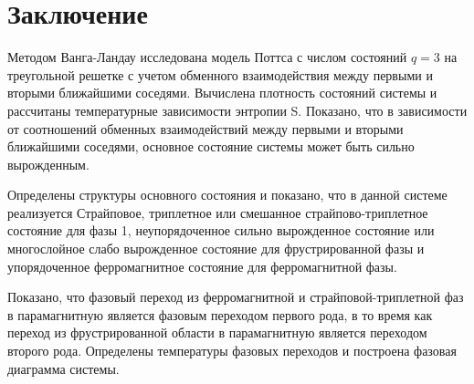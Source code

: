 \section{Заключение}

Методом Ванга-Ландау исследована модель Поттса с числом состояний $q=3$ на треугольной решетке с учетом обменного взаимодействия между первыми и вторыми ближайшими соседями. Вычислена плотность состояний системы и рассчитаны температурные зависимости энтропии S. Показано, что в зависимости от соотношений обменных взаимодействий между первыми и вторыми ближайшими соседями, основное состояние системы может быть сильно вырожденным.

Определены структуры основного состояния и показано, что в данной системе реализуется Страйповое, триплетное или смешанное страйпово-триплетное состояние для фазы 1, неупорядоченное сильно вырожденное состояние или многослойное слабо вырожденное состояние для фрустрированной фазы и упорядоченное ферромагнитное состояние для ферромагнитной фазы.

Показано, что фазовый переход из ферромагнитной и страйповой-триплетной фаз в парамагнитную является фазовым переходом первого рода, в то время как переход из фрустрированной области в парамагнитную является переходом второго рода. Определены температуры фазовых переходов и построена фазовая диаграмма системы.





